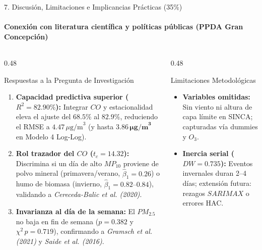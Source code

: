\documentclass[aspectratio=169, 9pt]{beamer}
\begin{document}
\begin{frame}{7. Discusión, Limitaciones e Implicancias Prácticas (35\%)}
\framesubtitle{Conexión con literatura científica y políticas públicas (PPDA Gran Concepción)}

\begin{columns}[T]
  \begin{column}{0.48\textwidth}
    \begin{block}{\footnotesize Respuestas a la Pregunta de Investigación}
      \scriptsize
      \begin{enumerate}\scriptsize\setlength{\itemsep}{2pt}
        \item \textbf{Capacidad predictiva superior ($R^2 = 82.90\%$):} Integrar $CO$ y estacionalidad eleva el ajuste del $68.5\%$ al $82.9\%$, reduciendo el RMSE a $4.47\,\mu\text{g/m}^3$ (y hasta $\mathbf{3.86\,\mu\text{g/m}^3}$ en Modelo 4 Log-Log).
        \item \textbf{Rol trazador del $CO$ ($t_c = 14.32$):} Discrimina si un día de alto $MP_{10}$ proviene de polvo mineral (primavera/verano, $\hat{\beta}_1 = 0.26$) o humo de biomasa (invierno, $\hat{\beta}_1 = 0.82\text{--}0.84$), validando a \textit{Cereceda-Balic et al. (2020)}.
        \item \textbf{Invarianza al día de la semana:} El $PM_{2.5}$ no baja en fin de semana ($p = 0.382$ y $\chi^2\,p = 0.719$), confirmando a \textit{Gramsch et al. (2021)} y \textit{Saide et al. (2016)}.
      \end{enumerate}
    \end{block}
  \end{column}

  \begin{column}{0.48\textwidth}
    \begin{alertblock}{\footnotesize Limitaciones Metodológicas}
      \scriptsize
      \begin{itemize}\scriptsize\setlength{\itemsep}{1pt}
        \item \textbf{Variables omitidas:} Sin viento ni altura de capa límite en SINCA; capturadas vía dummies y $O_3$.
        \item \textbf{Inercia serial ($DW = 0.735$):} Eventos invernales duran 2–4 días; extensión futura: rezagos $SARIMAX$ o errores HAC.
      \end{itemize}
    \end{alertblock}


\end{column}
\end{columns}
\end{frame}
\end{document}
